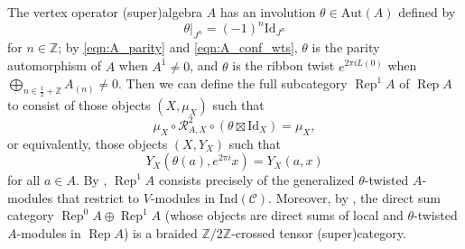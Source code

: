 \documentclass[11pt, reqno]{amsart}
\theoremstyle{definition}\newtheorem{defi}[thm]{Definition}
\theoremstyle{definition}\newtheorem{rem}[thm]{Remark}
\theoremstyle{definition}\newtheorem{exam}[thm]{Example}
\theoremstyle{definition}\newtheorem{assum}[thm]{Assumption}
\newcommand{\cR}{\mathcal{R}}
\newcommand{\cC}{\mathcal{C}}
\newcommand{\ZZ}{\mathbb{Z}}
\newcommand{\Id}{\mathrm{Id}}
\newcommand{\tens}{\boxtimes}
\newcommand{\ind}{\mathrm{Ind}}
\newcommand{\odd}{\overline{1}}
\DeclareMathOperator{\rep}{Rep}
\newcommand{\repA}{\rep A}
\begin{document}
The vertex operator (super)algebra $A$ has an involution $\theta\in\mathrm{Aut}(A)$ defined by 
\begin{equation*}
\theta\vert_{J^n} = (-1)^n\Id_{J^n}
\end{equation*}
for $n\in\ZZ$; by \eqref{eqn:A_parity} and \eqref{eqn:A_conf_wts}, $\theta$ is the parity automorphism of $A$ when $A^{\odd}\neq 0$, and $\theta$ is the ribbon twist $e^{2\pi i L(0)}$ when $\bigoplus_{n\in\frac{1}{2}+\ZZ} A_{(n)}\neq 0$. Then we can define the full subcategory $\rep^1A$ of $\repA$ to consist of those objects $(X,\mu_X)$ such that
\begin{equation*}
\mu_X\circ\cR_{A,X}^2\circ(\theta\tens\Id_X)=\mu_X,
\end{equation*}
or equivalently, those objects $(X,Y_X)$ such that
\begin{equation*}
Y_X(\theta(a),e^{2\pi i} x)=Y_X(a,x)
\end{equation*}
for all $a\in A$. By \cite[Theorem 4.14]{McR-orb2}, $\rep^1A$ consists precisely of the generalized $\theta$-twisted $A$-modules that restrict to $V$-modules in $\ind(\cC)$. Moreover, by \cite[Theorem 4.15(2)]{McR-orb2}, the direct sum category $\rep^0A\oplus\rep^1A$ (whose objects are direct sums of local and $\theta$-twisted $A$-modules in $\repA$) is a braided $\ZZ/2\ZZ$-crossed tensor (super)category.

 
\end{document}
